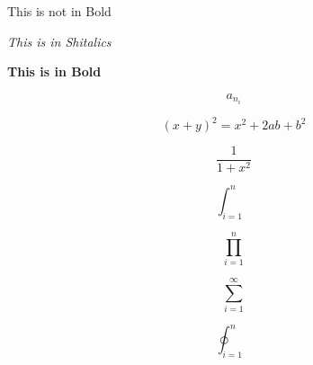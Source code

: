 \documentclass{article}
\begin{document}
This is not in Bold

\textit{This is in Shitalics}

\textbf{This is in Bold}

\[ a_{n_i} \]

\[ (x + y)^2 = x^2 + 2ab + b^2\]

\[ \frac{1}{1 + x^2}\]

\[ \int_{i=1}^n \]

\[ \prod_{i=1}^n \]

\[ \sum_{i=1}^{\infty} \]

\[ \oint_{i=1}^n \]
\end{document}
